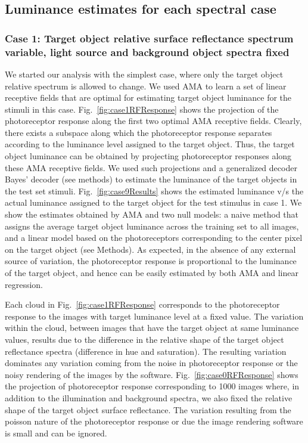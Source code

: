 \documentclass{jov}
\begin{document}
\subsection{Luminance estimates for each spectral case}
\subsubsection{Case 1: Target object relative surface reflectance spectrum variable, light source and background object spectra fixed}
We started our analysis with the simplest case, where only the target object relative spectrum is allowed to change. 
We used AMA to learn a set of linear receptive fields that are optimal for estimating target object luminance for the stimuli in this case. 
Fig.~\ref{fig:case1RFResponse} shows the projection of the photoreceptor response along the first two optimal AMA receptive fields. 
Clearly, there exists a subspace along which the photoreceptor response separates according to the luminance level assigned to the target object. 
Thus, the target object luminance can be obtained by projecting photoreceptor responses along these AMA receptive fields. 
We used such projections and a generalized decoder Bayes' decoder (see methods) to estimate the luminance of the target objects in the test set stimuli.
Fig.~\ref{fig:case9Results} shows the estimated luminance v/s the actual luminance assigned to the target object for the test stimulus in case 1. 
We show the estimates obtained by AMA and two null models: a naive method that assigns the average target object luminance across the training set to all images, and a linear model based on the photoreceptors corresponding to the center pixel on the target object (see Methods). 
As expected, in the absence of any external source of variation, the photoreceptor response is proportional to the luminance of the target object, and hence can be easily estimated by both AMA and linear regression.

Each cloud in Fig.~\ref{fig:case1RFResponse} corresponds to the photoreceptor response to the images with target luminance level at a fixed value. 
The variation within the cloud, between images that have the target object at same luminance values, results due to the difference in the relative shape of the target object reflectance spectra (difference in hue and saturation). 
The resulting variation dominates any variation coming from the noise in photoreceptor response or the noisy rendering of the images by the software.
Fig.~\ref{fig:case0RFResponse} shows the projection of photoreceptor response corresponding to 1000 images where, in addition to the illumination and background spectra, we also fixed the relative shape of the target object surface reflectance. 
The variation resulting from the poisson nature of the photoreceptor response or due the image rendering software is small and can be ignored.
\end{document}
